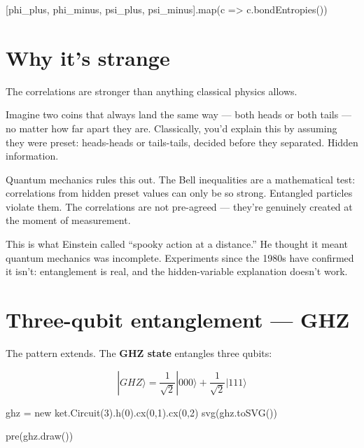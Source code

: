 \documentclass[
  11pt,
  letterpaper,
  oneside]{scrbook}
\newenvironment{Shaded}{\begin{snugshade}}{\end{snugshade}}
\newcommand{\NormalTok}[1]{\textcolor[rgb]{0.00,0.23,0.31}{#1}}
\begin{document}
\begin{Shaded}
\begin{Highlighting}[]
\NormalTok{[phi\_plus, phi\_minus, psi\_plus, psi\_minus].map(c =\textgreater{} c.bondEntropies())}
\end{Highlighting}
\end{Shaded}

\section{Why it's strange}\label{why-its-strange}

The correlations are stronger than anything classical physics allows.

Imagine two coins that always land the same way --- both heads or both
tails --- no matter how far apart they are. Classically, you'd explain
this by assuming they were preset: heads-heads or tails-tails, decided
before they separated. Hidden information.

Quantum mechanics rules this out. The Bell inequalities are a
mathematical test: correlations from hidden preset values can only be so
strong. Entangled particles violate them. The correlations are not
pre-agreed --- they're genuinely created at the moment of measurement.

This is what Einstein called ``spooky action at a distance.'' He thought
it meant quantum mechanics was incomplete. Experiments since the 1980s
have confirmed it isn't: entanglement is real, and the hidden-variable
explanation doesn't work.

\section{Three-qubit entanglement ---
GHZ}\label{three-qubit-entanglement-ghz}

The pattern extends. The \textbf{GHZ state} entangles three qubits:

\[|GHZ\rangle = \frac{1}{\sqrt{2}}|000\rangle + \frac{1}{\sqrt{2}}|111\rangle\]

\begin{Shaded}
\begin{Highlighting}[]
\NormalTok{ghz = new ket.Circuit(3).h(0).cx(0,1).cx(0,2)}
\NormalTok{svg(ghz.toSVG())}
\end{Highlighting}
\end{Shaded}

\begin{Shaded}
\begin{Highlighting}[]
\NormalTok{pre(ghz.draw())}
\end{Highlighting}
\end{Shaded}
\end{document}
